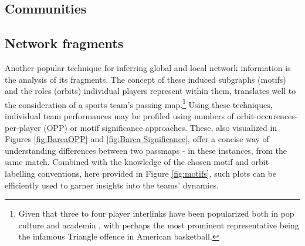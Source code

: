 \documentclass[9pt,twocolumn,twoside]{pnas-report}
\begin{document}
\subsection*{Communities}
\subsection*{Network fragments}
Another popular technique for inferring global and local network information is the analysis of its fragments. The concept of these induced subgraphs (motifs) and the roles (orbits) individual players represent within them, translates well to the consideration of a sports team's passing map.\footnote{Given that three to four player interlinks have been popularized both in pop culture and academia \cite{triangle}, with perhaps the most prominent representative being the infamous Triangle offence in American basketball.}  Using these techniques, individual team performances may be profiled using numbers of orbit-occurences-per-player (OPP) or motif significance approaches. These, also visualized in Figures \ref{fig:BarcaOPP} and \ref{fig:Barca Significance}, offer a concise way of understanding differences between two passmaps - in these instances, from the same match. Combined with the knowledge of the chosen motif and orbit labelling conventions, here provided in Figure \ref{fig:motifs}, such plots can be efficiently used to garner insights into the teams' dynamics. 
\end{document}
